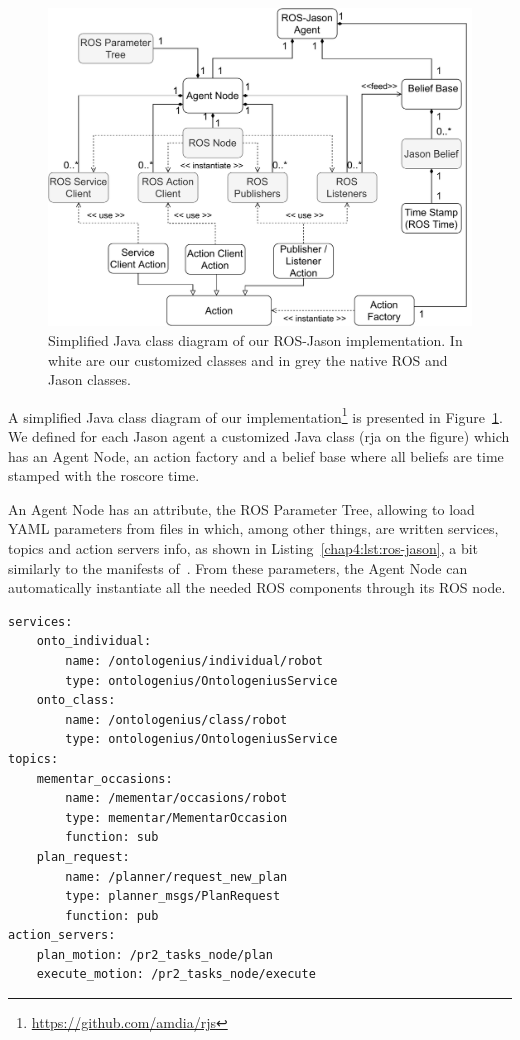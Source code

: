 \documentclass[a4paper,11pt,twoside]{StyleThese}
\begin{document}
\begin{figure}[!ht]
	\includegraphics[width=\linewidth]{figures/chapter2/RJS_diagram.pdf}
	\caption{Simplified Java class diagram of our ROS-Jason implementation. In white are our customized classes and in grey the native ROS and Jason classes.}
	\label{chap4:fig:rjs}
\end{figure}

A simplified Java class diagram of our  implementation\footnote{\url{https://github.com/amdia/rjs}} is presented in Figure~\ref{chap4:fig:rjs}. We defined for each Jason agent a customized Java class (\acrfull{rja} on the figure) which has an Agent Node, an action factory and a belief base where all beliefs are time stamped with the roscore time. 

An Agent Node has an attribute, the ROS Parameter Tree, allowing to load YAML parameters from files in which, among other things, are written services, topics and action servers info, as shown in Listing~\ref{chap4:lst:ros-jason}, a bit similarly to the manifests of~\cite{silva_2020_embedded}. From these parameters, the Agent Node can automatically instantiate all the needed ROS components through its ROS node. 

\begin{lstlisting}[caption={Example of service, topic and action server definitions in a YAML file.}, label={chap4:lst:ros-jason}]
services:
	onto_individual: 
		name: /ontologenius/individual/robot
		type: ontologenius/OntologeniusService
	onto_class: 
		name: /ontologenius/class/robot
		type: ontologenius/OntologeniusService
topics:
	mementar_occasions: 
		name: /mementar/occasions/robot
		type: mementar/MementarOccasion
		function: sub
	plan_request:
		name: /planner/request_new_plan
		type: planner_msgs/PlanRequest
		function: pub
action_servers:
	plan_motion: /pr2_tasks_node/plan
	execute_motion: /pr2_tasks_node/execute
\end{lstlisting}
\end{document}
